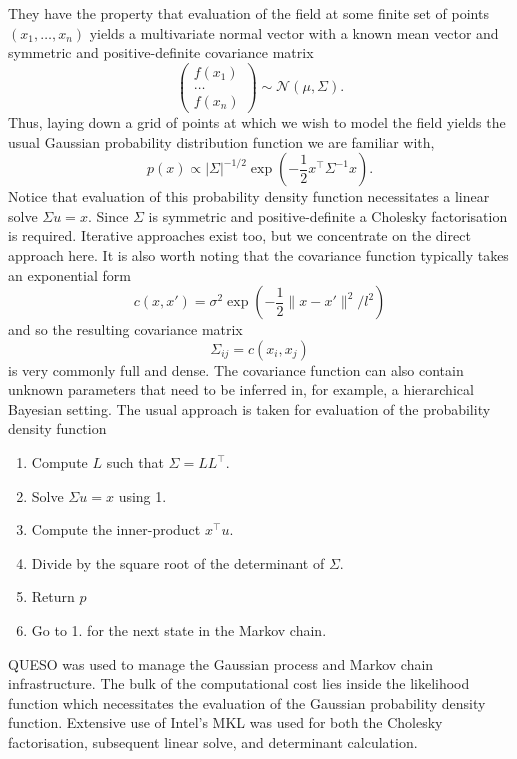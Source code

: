 They have the property that evaluation of the field at some finite set of
points $(x_1, \ldots, x_n)$ yields a multivariate normal vector with a known
mean vector and symmetric and positive-definite covariance matrix
\begin{equation}
  \begin{pmatrix}
    f(x_1) \\
    \hdots \\
    f(x_n)
  \end{pmatrix}
  \sim \mathcal{N}(\mu, \Sigma).
\end{equation}
Thus, laying down a grid of points at which we wish to model the field yields
the usual Gaussian probability distribution function we are familiar with,
\begin{equation}
  p(x) \propto |\Sigma|^{-1/2} \exp(-\frac12 x^\top \Sigma^{-1} x).
\end{equation}
Notice that evaluation of this probability density function necessitates a
linear solve $\Sigma u = x$.  Since $\Sigma$ is symmetric and positive-definite
a Cholesky factorisation is required.  Iterative approaches exist too, but we
concentrate on the direct approach here.  It is also worth noting that the
covariance function typically takes an exponential form
\begin{equation}
  c(x, x') = \sigma^2 \exp(-\frac12 \| x - x' \|^2 / l^2)
\end{equation}
and so the resulting covariance matrix
\begin{equation}
  \Sigma_{ij} = c(x_i, x_j)
\end{equation}
is very commonly full and dense.  The covariance function can also contain
unknown parameters that need to be inferred in, for example, a hierarchical
Bayesian setting.  The usual approach is taken for evaluation of the
probability density function
\begin{enumerate}
  \item Compute $L$ such that $\Sigma = LL^\top$.
  \item Solve $\Sigma u = x$ using 1.
  \item Compute the inner-product $x^\top u$.
  \item Divide by the square root of the determinant of $\Sigma$.
  \item Return $p$
  \item Go to 1. for the next state in the Markov chain.
\end{enumerate}

QUESO was used to manage the Gaussian process and Markov chain infrastructure.
The bulk of the computational cost lies inside the likelihood function which
necessitates the evaluation of the Gaussian probability density function.
Extensive use of Intel's MKL was used for both the Cholesky factorisation,
subsequent linear solve, and determinant calculation.

